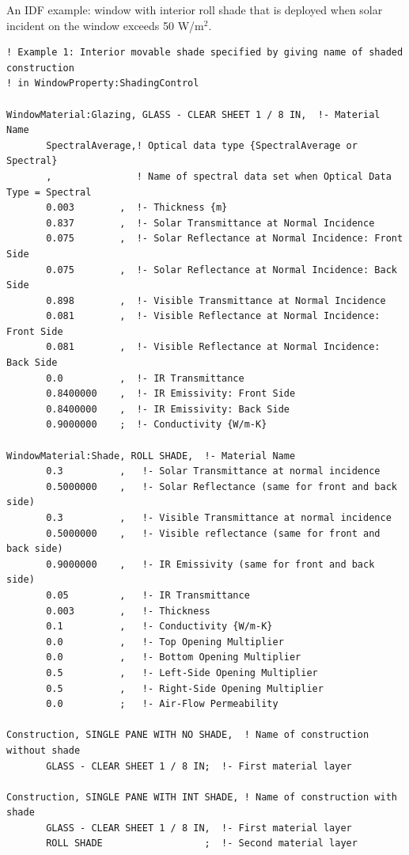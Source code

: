 An IDF example: window with interior roll shade that is deployed when solar incident on the window exceeds 50 W/m\(^{2}\).

\begin{lstlisting}
! Example 1: Interior movable shade specified by giving name of shaded construction
! in WindowProperty:ShadingControl

WindowMaterial:Glazing, GLASS - CLEAR SHEET 1 / 8 IN,  !- Material Name
       SpectralAverage,! Optical data type {SpectralAverage or Spectral}
       ,               ! Name of spectral data set when Optical Data Type = Spectral
       0.003        ,  !- Thickness {m}
       0.837        ,  !- Solar Transmittance at Normal Incidence
       0.075        ,  !- Solar Reflectance at Normal Incidence: Front Side
       0.075        ,  !- Solar Reflectance at Normal Incidence: Back Side
       0.898        ,  !- Visible Transmittance at Normal Incidence
       0.081        ,  !- Visible Reflectance at Normal Incidence: Front Side
       0.081        ,  !- Visible Reflectance at Normal Incidence: Back Side
       0.0          ,  !- IR Transmittance
       0.8400000    ,  !- IR Emissivity: Front Side
       0.8400000    ,  !- IR Emissivity: Back Side
       0.9000000    ;  !- Conductivity {W/m-K}

WindowMaterial:Shade, ROLL SHADE,  !- Material Name
       0.3          ,   !- Solar Transmittance at normal incidence
       0.5000000    ,   !- Solar Reflectance (same for front and back side)
       0.3          ,   !- Visible Transmittance at normal incidence
       0.5000000    ,   !- Visible reflectance (same for front and back side)
       0.9000000    ,   !- IR Emissivity (same for front and back side)
       0.05         ,   !- IR Transmittance
       0.003        ,   !- Thickness
       0.1          ,   !- Conductivity {W/m-K}
       0.0          ,   !- Top Opening Multiplier
       0.0          ,   !- Bottom Opening Multiplier
       0.5          ,   !- Left-Side Opening Multiplier
       0.5          ,   !- Right-Side Opening Multiplier
       0.0          ;   !- Air-Flow Permeability

Construction, SINGLE PANE WITH NO SHADE,  ! Name of construction without shade
       GLASS - CLEAR SHEET 1 / 8 IN;  !- First material layer

Construction, SINGLE PANE WITH INT SHADE, ! Name of construction with shade
       GLASS - CLEAR SHEET 1 / 8 IN,  !- First material layer
       ROLL SHADE                  ;  !- Second material layer


\end{lstlisting}
